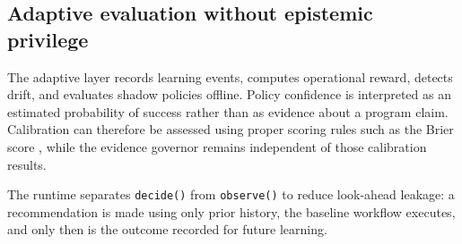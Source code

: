 \subsection{Adaptive evaluation without epistemic privilege}

The adaptive layer records learning events, computes operational reward, detects drift, and evaluates shadow policies offline. Policy confidence is interpreted as an estimated probability of success rather than as evidence about a program claim. Calibration can therefore be assessed using proper scoring rules such as the Brier score \cite{brier1950verification}, while the evidence governor remains independent of those calibration results.

The runtime separates \texttt{decide()} from \texttt{observe()} to reduce look-ahead leakage: a recommendation is made using only prior history, the baseline workflow executes, and only then is the outcome recorded for future learning.